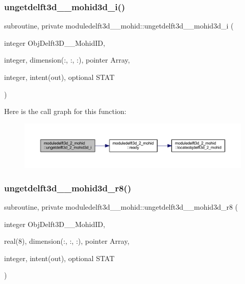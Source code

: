 \subsubsection{\texorpdfstring{ungetdelft3d\+\_\+\_\+mohid3d\+\_\+i()}{ungetdelft3d\_2\_mohid3d\_i()}}
{\footnotesize\ttfamily subroutine, private moduledelft3d\+\_\+\_\+mohid\+::ungetdelft3d\+\_\+\_\+mohid3d\+\_\+i (\begin{DoxyParamCaption}\item[{integer}]{Obj\+Delft3\+D\+\_\+\_\+\+Mohid\+ID,  }\item[{integer, dimension(\+:, \+:, \+:), pointer}]{Array,  }\item[{integer, intent(out), optional}]{S\+T\+AT }\end{DoxyParamCaption})\hspace{0.3cm}{\ttfamily [private]}}

Here is the call graph for this function\+:\nopagebreak
\begin{figure}[H]
\begin{center}
\leavevmode
\includegraphics[width=350pt]{namespacemoduledelft3d__2__mohid_aa4cca39e63d47844aa594f71d019af8c_cgraph}
\end{center}
\end{figure}
\mbox{\label{namespacemoduledelft3d__2__mohid_a54e3fcc0277aae3ad660ec439e7e4a3c}} 
\subsubsection{\texorpdfstring{ungetdelft3d\+\_\+\_\+mohid3d\+\_\+r8()}{ungetdelft3d\_2\_mohid3d\_r8()}}
{\footnotesize\ttfamily subroutine, private moduledelft3d\+\_\+\_\+mohid\+::ungetdelft3d\+\_\+\_\+mohid3d\+\_\+r8 (\begin{DoxyParamCaption}\item[{integer}]{Obj\+Delft3\+D\+\_\+\_\+\+Mohid\+ID,  }\item[{real(8), dimension(\+:, \+:, \+:), pointer}]{Array,  }\item[{integer, intent(out), optional}]{S\+T\+AT }\end{DoxyParamCaption})\hspace{0.3cm}{\ttfamily [private]}}


